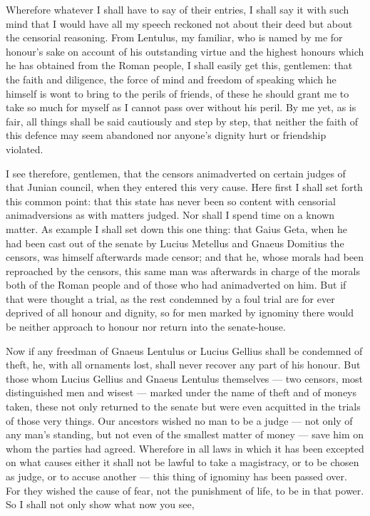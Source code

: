 Wherefore whatever I shall have to say of their entries, I shall say it with such mind that I would have all my speech reckoned not about their deed but about the censorial reasoning. From Lentulus, my familiar, who is named by me for honour's sake on account of his outstanding virtue and the highest honours which he has obtained from the Roman people, I shall easily get this, gentlemen: that the faith and diligence, the force of mind and freedom of speaking which he himself is wont to bring to the perils of friends, of these he should grant me to take so much for myself as I cannot pass over without his peril. By me yet, as is fair, all things shall be said cautiously and step by step, that neither the faith of this defence may seem abandoned nor anyone's dignity hurt or friendship violated.

 I see therefore, gentlemen, that the censors animadverted on certain judges of that Junian council, when they entered this very cause. Here first I shall set forth this common point: that this state has never been so content with censorial animadversions as with matters judged. Nor shall I spend time on a known matter. As example I shall set down this one thing: that Gaius Geta, when he had been cast out of the senate by Lucius Metellus and Gnaeus Domitius the censors, was himself afterwards made censor; and that he, whose morals had been reproached by the censors, this same man was afterwards in charge of the morals both of the Roman people and of those who had animadverted on him. But if that were thought a trial, as the rest condemned by a foul trial are for ever deprived of all honour and dignity, so for men marked by ignominy there would be neither approach to honour nor return into the senate-house.

 Now if any freedman of Gnaeus Lentulus or Lucius Gellius shall be condemned of theft, he, with all ornaments lost, shall never recover any part of his honour. But those whom Lucius Gellius and Gnaeus Lentulus themselves --- two censors, most distinguished men and wisest --- marked under the name of theft and of moneys taken, these not only returned to the senate but were even acquitted in the trials of those very things. Our ancestors wished no man to be a judge --- not only of any man's standing, but not even of the smallest matter of money --- save him on whom the parties had agreed. Wherefore in all laws in which it has been excepted on what causes either it shall not be lawful to take a magistracy, or to be chosen as judge, or to accuse another --- this thing of ignominy has been passed over. For they wished the cause of fear, not the punishment of life, to be in that power. So I shall not only show what now you see,

